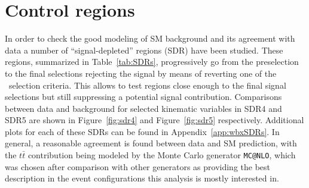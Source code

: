 

%



\section{Control regions}\label{sec:wbxCR}

In order to check the good modeling of SM background
and its agreement with data a number of ``signal-depleted'' regions (SDR) 
have been studied. These regions, summarized in Table~\ref{tab:SDRs},
progressively go from the preselection to the final selections 
rejecting the signal by means of reverting one of the \tight\ selection criteria.
This allows to test regions close enough to the final signal selections
but still suppressing a potential signal contribution.
Comparisons between data and background for 
selected kinematic variables in SDR4 and SDR5
are shown in Figure~\ref{fig:sdr4} and Figure~\ref{fig:sdr5} respectively.
Additional plots for each of these SDRs can be found in 
Appendix~\ref{app:wbxSDRs}.
In general, a reasonable agreement is found between data and SM
prediction, with the $t\bar{t}$ contribution being modeled by the Monte Carlo 
generator \texttt{MC@NLO}, which was chosen after comparison with other
generators as providing the best description in the event configurations
this analysis is mostly interested in.

